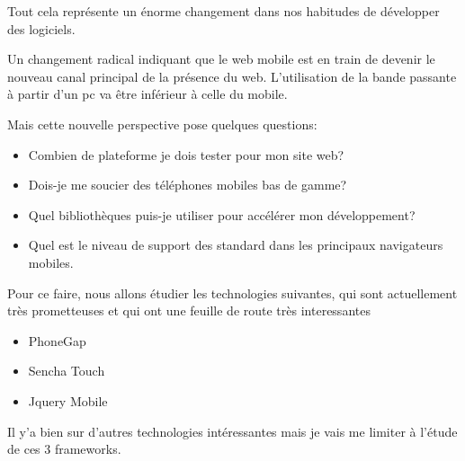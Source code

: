 Tout cela représente un énorme changement dans nos habitudes de développer des logiciels.

Un changement radical indiquant  que le web mobile est en train de devenir le nouveau canal principal de la présence du web. L’utilisation de la bande passante à partir d’un pc va être inférieur à celle du mobile.

Mais cette nouvelle perspective pose quelques questions:

\begin{itemize}

  \item
  Combien de plateforme je dois tester pour mon site web?

  \item
  Dois-je me soucier des téléphones mobiles bas de gamme?

  \item
  Quel bibliothèques puis-je utiliser pour accélérer mon développement?

  \item
  Quel est le niveau de support des standard dans les principaux navigateurs mobiles.

\end{itemize}
Pour ce faire, nous allons étudier les technologies suivantes, qui sont actuellement très prometteuses et qui ont une feuille de route très interessantes


\begin{itemize}

  \item[\textbullet]
  PhoneGap

  \item[\textbullet]
  Sencha Touch

  \item[\textbullet]
  Jquery Mobile

\end{itemize}

Il y’a bien sur d’autres technologies intéressantes mais je vais me limiter à l’étude de ces 3 frameworks.


